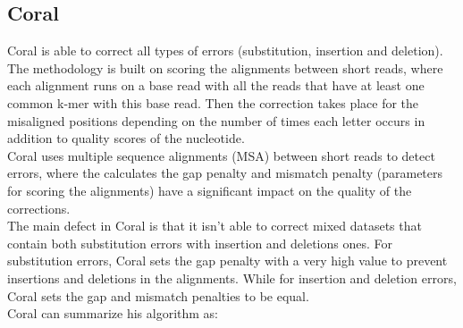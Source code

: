 \documentclass[12pt,openany]{llncs}
\begin{document}
\subsection{Coral}
Coral \cite{Coral} is able to correct all types of errors (substitution, insertion and deletion). The methodology is built on scoring the alignments between short reads, where each alignment runs on a base read with all the reads that have at least one common k-mer with this base read. Then the correction takes place for the misaligned positions depending on the number of times each letter occurs in addition to quality scores of the nucleotide.
\\
Coral uses multiple sequence alignments (MSA) \cite{coral-alignment} between short reads to detect errors, where the calculates the gap penalty and mismatch penalty (parameters for scoring the alignments) have a significant impact on the quality of the corrections. 
\\
The main defect in Coral is that it isn't able to correct mixed datasets that contain both substitution errors with insertion and deletions ones.
For substitution errors, Coral sets the gap penalty with a very high value to prevent insertions and deletions in the alignments. While for insertion and deletion errors, Coral sets the gap and mismatch penalties to be equal.
\\
Coral can summarize his algorithm as:
\end{document}
